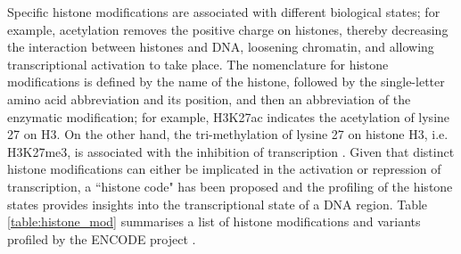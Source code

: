 Specific histone modifications are associated with different biological states; for example, acetylation removes the positive charge on histones, thereby decreasing the interaction between histones and DNA, loosening chromatin, and allowing transcriptional activation to take place. The nomenclature for histone modifications is defined by the name of the histone, followed by the single-letter amino acid abbreviation and its position, and then an abbreviation of the enzymatic modification; for example, H3K27ac indicates the acetylation of lysine 27 on H3. On the other hand, the tri-methylation of lysine 27 on histone H3, i.e. H3K27me3, is associated with the inhibition of transcription \citep{pmid21652639}. Given that distinct histone modifications can either be implicated in the activation or repression of transcription, a ``histone code" has been proposed \citep{pmid11498575} and the profiling of the histone states provides insights into the transcriptional state of a DNA region. Table \ref{table:histone_mod} summarises a list of histone modifications and variants profiled by the ENCODE project \citep{pmid22955616}.


